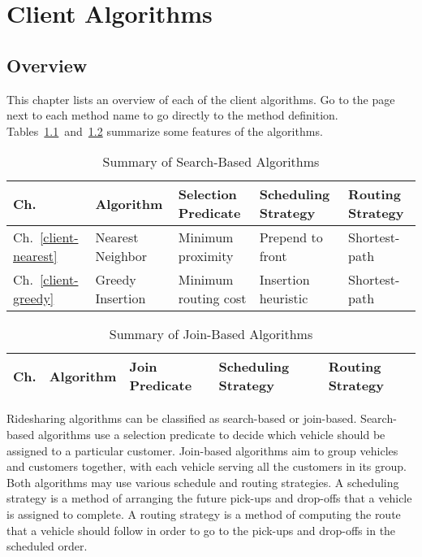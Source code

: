 \part{Client Algorithms}%
\label{part-client}

\chapter{Overview}
\label{client-overview}

\renewcommand{\thepage}{\arabic{page}}
\setcounter{page}{1}

This chapter lists an overview of each of the client algorithms. Go to the page
next to each method name to go directly to the method definition.
Tables~\ref{tab:search-algorithms}~and~\ref{tab:join-algorithms} summarize some
features of the algorithms.

\begin{table}[h]
\begin{center}
\caption{Summary of Search-Based Algorithms}
\label{tab:search-algorithms}
\begin{tabular}{|l|l|l|l|l|}
\hline
Ch. & Algorithm & Selection Predicate & Scheduling Strategy & Routing Strategy \\
\hline
Ch.~\ref{client-nearest} & Nearest Neighbor & Minimum proximity & Prepend to front & Shortest-path \\
Ch.~\ref{client-greedy} & Greedy Insertion & Minimum routing cost & Insertion heuristic & Shortest-path \\
\hline
\end{tabular}
\end{center}
\end{table}

\begin{table}[h]
\begin{center}
\caption{Summary of Join-Based Algorithms}
\label{tab:join-algorithms}
\begin{tabular}{|l|l|l|l|l|}
\hline
Ch. & Algorithm & Join Predicate & Scheduling Strategy & Routing Strategy \\
\hline
\end{tabular}
\end{center}
\end{table}

Ridesharing algorithms can be classified as search-based or join-based.
Search-based algorithms use a selection predicate to decide which vehicle
should be assigned to a particular customer. Join-based algorithms aim to group
vehicles and customers together, with each vehicle serving all the customers in
its group. Both algorithms may use various schedule and routing strategies.  A
scheduling strategy is a method of arranging the future pick-ups and drop-offs
that a vehicle is assigned to complete. A routing strategy is a method of
computing the route that a vehicle should follow in order to go to the pick-ups
and drop-offs in the scheduled order.


